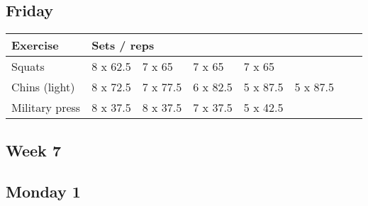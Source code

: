 \documentclass[12pt, a4paper]{article}%
\begin{document}
  \subsection*{\hspace{0.5em} Friday }


  \begin{tabular}{l|lllllll}
  \hspace{0.75em} \textbf{Exercise} & \multicolumn{ 7 }{l}{ \textbf{Sets / reps} } \\ \hline

            \hspace{0.75em} Squats
            & 8 x 62.5
            & 7 x 65
            & 7 x 65
            & 7 x 65
            & 
            & 
            & 
            \\


            \hspace{0.75em} Chins (light)
            & 8 x 72.5
            & 7 x 77.5
            & 6 x 82.5
            & 5 x 87.5
            & 5 x 87.5
            & 
            & 
            \\


            \hspace{0.75em} Military press
            & 8 x 37.5
            & 8 x 37.5
            & 7 x 37.5
            & 5 x 42.5
            & 
            & 
            & 
            \\


  \end{tabular}


\clearpage \subsection*{\hspace{0.25em} Week 7 }
  \subsection*{\hspace{0.5em} Monday 1 }
\end{document}
